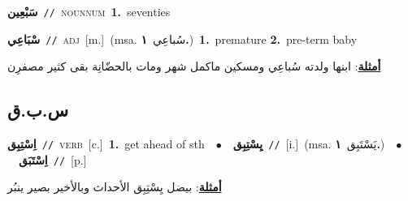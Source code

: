 \documentclass[10pt,a4paper,twoside]{article} %
\begin{document}
\begin{multicols}{2}
{{{{{{{{\setlength\topsep{0pt}\textbf{\foreignlanguage{arabic}{سَبْعِين}}\ {\color{gray}\texttt{//}\color{black}}\ \textsc{noun\textunderscore num}\ \textbf{1.}~seventies\ 

{\setlength\topsep{0pt}\textbf{\foreignlanguage{arabic}{سْبَاعِي}}\ {\color{gray}\texttt{//}\color{black}}\ \textsc{adj}\ [m.]\ \color{gray}(msa. \foreignlanguage{arabic}{سُباعِي}~\foreignlanguage{arabic}{\textbf{١.}})\color{black}\ \textbf{1.}~premature  \textbf{2.}~pre-term baby\  \begin{flushright}\color{gray}\foreignlanguage{arabic}{\textbf{\underline{\foreignlanguage{arabic}{أمثلة}}}: ابنها ولدته سُباعِي ومسكين ماكمل شهر ومات بالحضّانِة بقى كثير مصفرِن}\end{flushright}\color{black}} \vspace{2mm}

\vspace{-3mm}
\subsection*{\color{blue}\foreignlanguage{arabic}{س.ب.ق}\color{blue}{}} 

{\setlength\topsep{0pt}\textbf{\foreignlanguage{arabic}{اِسْتِبِق}}\ {\color{gray}\texttt{//}\color{black}}\ \textsc{verb}\ [c.]\ \textbf{1.}~get ahead of sth\ \ $\bullet$\ \ \setlength\topsep{0pt}\textbf{\foreignlanguage{arabic}{يِسْتِبِق}}\ {\color{gray}\texttt{//}\color{black}}\ [i.]\ \color{gray}(msa. \foreignlanguage{arabic}{يَسْتَبِق}~\foreignlanguage{arabic}{\textbf{١.}})\color{black}\ \ $\bullet$\ \ \setlength\topsep{0pt}\textbf{\foreignlanguage{arabic}{اِسْتَبَق}}\ {\color{gray}\texttt{//}\color{black}}\ [p.]\  \begin{flushright}\color{gray}\foreignlanguage{arabic}{\textbf{\underline{\foreignlanguage{arabic}{أمثلة}}}: بيضل يِسْتِبِق الأحداث وبالأخير بصير ينبُر}\end{flushright}\color{black}} \vspace{2mm}

}}}}}}}}
\end{multicols}
\end{document}
